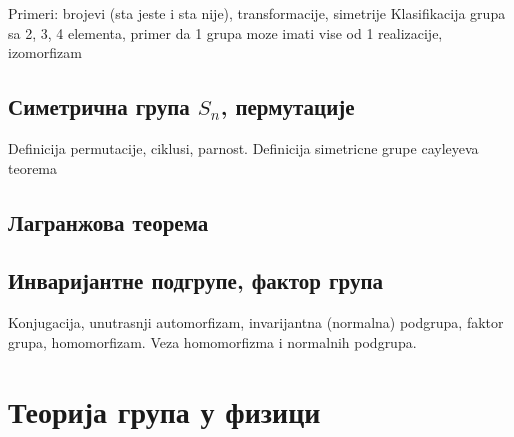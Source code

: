 \documentclass{report}
\theoremstyle{plain}
\theoremstyle{definition}
\begin{document}
Primeri: brojevi (sta jeste i sta nije), transformacije, simetrije
Klasifikacija grupa sa 2, 3, 4 elementa, primer da 1 grupa moze imati vise od 1 realizacije, izomorfizam
\section{Симетрична група $S_n$, пермутације}
Definicija permutacije, ciklusi, parnost.
Definicija simetricne grupe
cayleyeva teorema
\section{Лагранжова теорема}
\section{Инваријантне подгрупе, фактор група}
Konjugacija, unutrasnji automorfizam, invarijantna (normalna) podgrupa, faktor grupa, homomorfizam.
Veza homomorfizma i normalnih podgrupa.

\chapter{Теорија група у физици}
\end{document}
